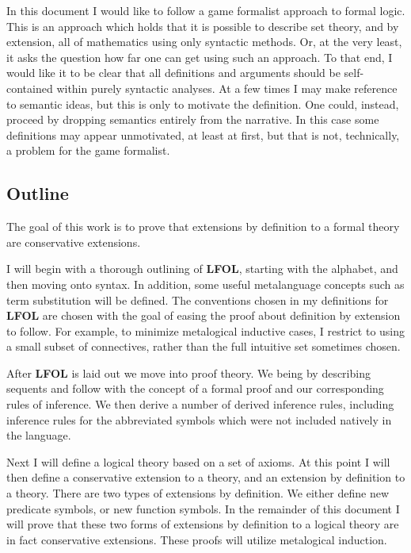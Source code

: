 \documentclass[12pt]{article}
\begin{document}
In this document I would like to follow a game formalist approach to formal logic.
This is an approach which holds that it is possible to describe set theory, and by extension, all of mathematics using only syntactic methods.
Or, at the very least, it asks the question how far one can get using such an approach.
To that end, I would like it to be clear that all definitions and arguments should be self-contained within purely syntactic analyses.
At a few times I may make reference to semantic ideas, but this is only to motivate the definition.
One could, instead, proceed by dropping semantics entirely from the narrative.
In this case some definitions may appear unmotivated, at least at first, but that is not, technically, a problem for the game formalist.

\subsection{Outline}

The goal of this work is to prove that extensions by definition to a formal theory are conservative extensions.

I will begin with a thorough outlining of \textbf{LFOL}, starting with the alphabet, and then moving onto syntax.
In addition, some useful metalanguage concepts such as term substitution will be defined.
The conventions chosen in my definitions for \textbf{LFOL} are chosen with the goal of easing the proof about definition by extension to follow.
For example, to minimize metalogical inductive cases, I restrict to using a small subset of connectives, rather than the full intuitive set sometimes chosen.

After \textbf{LFOL} is laid out we move into proof theory.
We being by describing sequents and follow with the concept of a formal proof and our corresponding rules of inference.
We then derive a number of derived inference rules, including inference rules for the abbreviated symbols which were not included natively in the language.

Next I will define a logical theory based on a set of axioms.
At this point I will then define a conservative extension to a theory, and an extension by definition to a theory.
There are two types of extensions by definition.
We either define new predicate symbols, or new function symbols.
In the remainder of this document I will prove that these two forms of extensions by definition to a logical theory are in fact conservative extensions.
These proofs will utilize metalogical induction.
\end{document}
